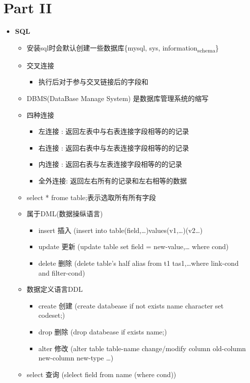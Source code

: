 \documentclass[11pt]{article}
\begin{document}
\section{Part II}
\label{sec:orgae0d5cd}
\begin{itemize}
\item \textbf{SQL}
\begin{itemize}
\item 安装sql时会默认创建一些数据库\{mysql, sys, information\textsubscript{schema}\}
\item 交叉连接
\begin{itemize}
\item 执行后对于参与交叉链接后的字段和
\end{itemize}
\item DBMS(DataBase Manage System) 是数据库管理系统的缩写
\item 四种连接
\begin{itemize}
\item 左连接 : 返回左表中与右表连接字段相等的的记录
\item 右连接 : 返回右表中与左表连接字段相等的的记录
\item 内连接 : 返回右表与左表连接字段相等的的记录
\item 全外连接: 返回左右所有的记录和左右相等的数据
\end{itemize}
\item select * frome table;表示选取所有所有字段
\item 属于DML(数据操纵语言)
\begin{itemize}
\item insert  插入 (insert into table(field,\ldots{})values(v1,\ldots{})(v2\ldots{})
\item update  更新 (update table set field = new-value,\ldots{} where cond)
\item delete  删除 (delete table's half alias from t1 tas1,\ldots{}where link-cond and filter-cond)
\end{itemize}
\item 数据定义语言DDL
\begin{itemize}
\item create  创建 (create databease if not exists name character set codeset;)
\item drop    删除 (drop  databease  if exists name;)
\item alter   修改 (alter table table-name change/modify column old-column new-column new-type \ldots{})
\end{itemize}
\item select   查询 (slelect field from name (where cond))

\end{itemize}
\end{itemize}
\end{document}
